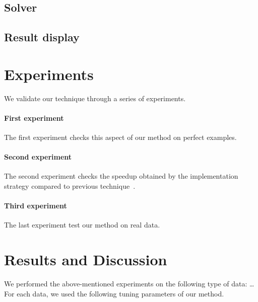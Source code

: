 \documentclass[10pt, conference]{IEEEtran}
\begin{document}
\subsection{Solver}


\subsection{Result display}



\section{Experiments}
%
We validate our technique through a series of experiments.


\paragraph*{First experiment}
%
The first experiment checks this aspect of our method on perfect examples.


\paragraph*{Second experiment}
%
The second experiment checks the speedup obtained by the implementation strategy compared to previous technique~\cite{Sibgrapi2015}.


\paragraph*{Third experiment}
%
The last experiment test our method on real data.



\section{Results and Discussion}
%
We performed the above-mentioned experiments on the following type of data: \ldots{} For each data, we used the following tuning parameters of our method.
\end{document}
